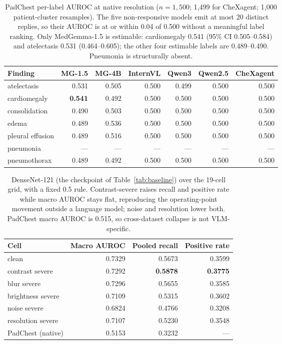 \begin{table}[H]
\centering
\footnotesize
\setlength{\tabcolsep}{4pt}
\caption{PadChest per-label AUROC at native resolution ($n=1{,}500$; 1,499 for CheXagent; 1,000 patient-cluster resamples). The five non-responsive models emit at most 20 distinct replies, so their AUROC is at or within 0.04 of 0.500 without a meaningful label ranking. Only MedGemma-1.5 is estimable: cardiomegaly 0.541 (95\% CI 0.505--0.584) and atelectasis 0.531 (0.464--0.605); the other four estimable labels are 0.489--0.490. Pneumonia is structurally absent.}
\label{tab:padlabel}
\begin{tabular}{lrrrrrr}
\toprule
Finding & MG-1.5 & MG-4B & InternVL & Qwen3 & Qwen2.5 & CheXagent \\
\midrule
atelectasis & 0.531 & 0.505 & 0.500 & 0.499 & 0.500 & 0.500 \\
cardiomegaly & \textbf{0.541} & 0.492 & 0.500 & 0.500 & 0.500 & 0.500 \\
consolidation & 0.490 & 0.503 & 0.500 & 0.500 & 0.500 & 0.500 \\
edema & 0.489 & 0.536 & 0.500 & 0.500 & 0.500 & 0.500 \\
pleural effusion & 0.489 & 0.516 & 0.500 & 0.500 & 0.500 & 0.500 \\
pneumonia & --- & --- & --- & --- & --- & --- \\
pneumothorax & 0.489 & 0.492 & 0.500 & 0.500 & 0.500 & 0.500 \\
\bottomrule
\end{tabular}
\end{table}

\begin{table}[H]
\centering
\small
\caption{DenseNet-121 (the checkpoint of Table~\ref{tab:baseline}) over the 19-cell grid, with a fixed 0.5 rule. Contrast-severe raises recall and positive rate while macro AUROC stays flat, reproducing the operating-point movement outside a language model; noise and resolution lower both. PadChest macro AUROC is 0.515, so cross-dataset collapse is not VLM-specific.}
\label{tab:densenetgrid}
\begin{tabular}{lrrr}
\toprule
Cell & Macro AUROC & Pooled recall & Positive rate \\
\midrule
clean & 0.7329 & 0.5673 & 0.3599 \\
contrast severe & 0.7292 & \textbf{0.5878} & \textbf{0.3775} \\
blur severe & 0.7296 & 0.5655 & 0.3585 \\
brightness severe & 0.7109 & 0.5315 & 0.3602 \\
noise severe & 0.6824 & 0.4766 & 0.3208 \\
resolution severe & 0.7107 & 0.5230 & 0.3548 \\
PadChest (native) & 0.5153 & 0.3232 & --- \\
\bottomrule
\end{tabular}
\end{table}

